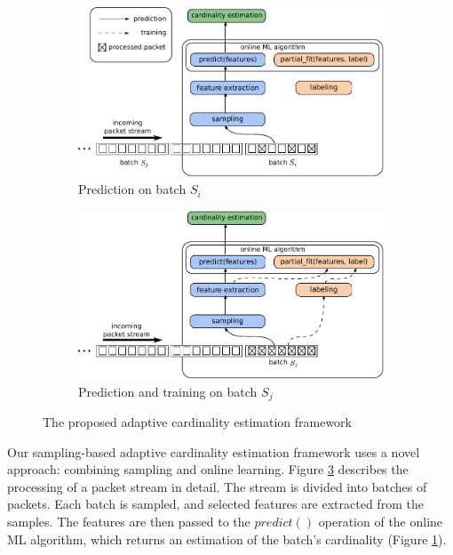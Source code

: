 		\begin{figure}[!bt]
			\centering
			\begin{subfigure}{.45\textwidth}
				\centering
				\includegraphics[width=1\linewidth]{img/prediction_new.pdf}
				\caption{Prediction on batch $S_i$}
				\label{fig:prediction}
			\end{subfigure}
			\hfill
			\begin{subfigure}{.45\textwidth}
				\centering
				\includegraphics[width=1\linewidth]{img/training_new.pdf}
				\caption{Prediction and training on batch $S_j$}
				\label{fig:training}
			\end{subfigure}
			\caption{The proposed adaptive cardinality estimation framework}
			\label{fig:framework}
		\end{figure}
		
		Our sampling-based adaptive cardinality estimation framework uses a novel approach: combining sampling and online learning. Figure \ref{fig:framework} describes the processing of a packet stream in detail. The stream is divided into batches of packets. Each batch is sampled, and selected features are extracted from the samples. The features are then passed to the $predict()$ operation of the online ML algorithm, which returns an estimation of the batch's cardinality (Figure \ref{fig:prediction}).
		
